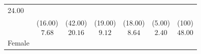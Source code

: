 \documentclass[11pt,a4paper,openany]{book}
\begin{document}
\begin{longtable}[]{@{}lcccccr@{}}
\begin{minipage}[t]{0.06\columnwidth}
24.00\strut
\end{minipage}\tabularnewline
\begin{minipage}[t]{0.05\columnwidth}\raggedright\strut
\strut
\end{minipage} & \begin{minipage}[t]{0.40\columnwidth}\centering\strut
(16.00)\strut
\end{minipage} & \begin{minipage}[t]{0.07\columnwidth}\centering\strut
(42.00)\strut
\end{minipage} & \begin{minipage}[t]{0.09\columnwidth}\centering\strut
(19.00)\strut
\end{minipage} & \begin{minipage}[t]{0.06\columnwidth}\centering\strut
(18.00)\strut
\end{minipage} & \begin{minipage}[t]{0.06\columnwidth}\centering\strut
(5.00)\strut
\end{minipage} & \begin{minipage}[t]{0.06\columnwidth}\raggedleft\strut
(100)\strut
\end{minipage}\tabularnewline
\begin{minipage}[t]{0.05\columnwidth}\raggedright\strut
\strut
\end{minipage} & \begin{minipage}[t]{0.40\columnwidth}\centering\strut
\[7.68\]\strut
\end{minipage} & \begin{minipage}[t]{0.07\columnwidth}\centering\strut
\[20.16\]\strut
\end{minipage} & \begin{minipage}[t]{0.09\columnwidth}\centering\strut
\[9.12\]\strut
\end{minipage} & \begin{minipage}[t]{0.06\columnwidth}\centering\strut
\[8.64\]\strut
\end{minipage} & \begin{minipage}[t]{0.06\columnwidth}\centering\strut
\[2.40\]\strut
\end{minipage} & \begin{minipage}[t]{0.06\columnwidth}\raggedleft\strut
\[48.00\]\strut
\end{minipage}\tabularnewline
\begin{minipage}[t]{0.05\columnwidth}\raggedright\strut
Female\strut
\end{minipage} & \begin{minipage}[t]{0.40\columnwidth}\centering\strut

\end{minipage}
\end{longtable}
\end{document}
